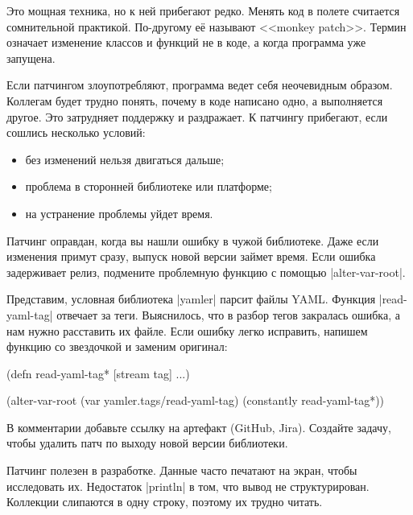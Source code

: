 Это мощная техника, но к ней прибегают редко. Менять код в полете считается
сомнительной практикой. По-другому е\"{е} называют <<monkey
patch>>. Термин означает
изменение классов и функций не в коде, а когда программа уже запущена.

Если патчингом злоупотребляют, программа ведет себя неочевидным
образом. Коллегам будет трудно понять, почему в коде написано одно, а
выполняется другое. Это затрудняет поддержку и раздражает. К патчингу прибегают,
если сошлись несколько условий:

\begin{itemize}

\item
  без изменений нельзя двигаться дальше;

\item
  проблема в сторонней библиотеке или платформе;

\item
  на устранение проблемы уйдет время.

\end{itemize}

Патчинг оправдан, когда вы нашли ошибку в чужой библиотеке. Даже если изменения
примут сразу, выпуск новой версии займет время. Если ошибка задерживает релиз,
подмените проблемную функцию с помощью \spverb|alter-var-root|.

Представим, условная библиотека \spverb|yamler| парсит файлы YAML. Функция
\spverb|read-yaml-tag| отвечает за теги. Выяснилось, что в разбор тегов
закралась ошибка, а нам нужно расставить их файле. Если ошибку легко исправить,
напишем функцию со звездочкой и заменим оригинал:

\begin{english}
  \begin{clojure}
(defn read-yaml-tag* [stream tag]
  ...)

(alter-var-root
 (var yamler.tags/read-yaml-tag)
 (constantly read-yaml-tag*))
  \end{clojure}
\end{english}

В комментарии добавьте ссылку на артефакт (GitHub, Jira). Создайте задачу,
чтобы удалить патч по выходу новой версии библиотеки.

Патчинг полезен в разработке. Данные часто печатают на экран, чтобы исследовать
их. Недостаток \spverb|println| в том, что вывод не структурирован. Коллекции
слипаются в одну строку, поэтому их трудно читать.

